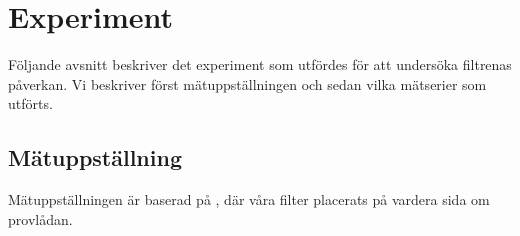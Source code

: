 \documentclass[main.tex]{subfiles}
\begin{document}
\chapter{Experiment}
\label{ch:exp}
Följande avsnitt beskriver det experiment som utfördes för att undersöka filtrenas påverkan. Vi beskriver först mätuppställningen och sedan vilka mätserier som utförts.



\section{Mätuppställning}
Mätuppställningen är baserad på , där våra filter placerats på vardera sida om provlådan.

\end{document}
